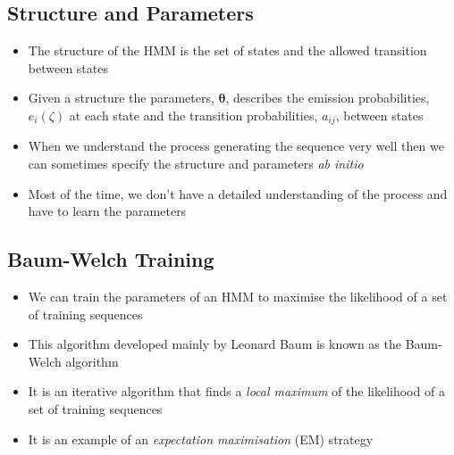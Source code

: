 
\begin{slide}
\section{Structure and Parameters}

\begin{PauseHighLight}
  \begin{itemize}
  \item The structure of the HMM is the set of states and the allowed
    transition between states\pause
  \item Given a structure the parameters, $\bm{\theta}$, describes the
    emission probabilities, $e_i(\zeta)$ at each state and the
    transition probabilities, $a_{ij}$, between states\pause
  \item When we understand the process generating the sequence very well
    then we can sometimes specify the structure and parameters
    \textit{ab initio}\pause
  \item Most of the time, we don't have a detailed understanding of the
    process and have to learn the parameters\pause
  \end{itemize}
\end{PauseHighLight}

\end{slide}


\Outline %

\begin{slide}
\section{Baum-Welch Training}

\begin{PauseHighLight}
  \begin{itemize}
  \item We can train the parameters of an HMM to maximise the likelihood
    of a set of training sequences\pause
  \item This algorithm developed mainly by Leonard Baum is known as
    the Baum-Welch algorithm\pause
  \item It is an iterative algorithm that finds a \emph{local maximum}
    of the likelihood of a set of training sequences\pause
  \item It is an example of an \emph{expectation maximisation} (EM)
    strategy\pause
  \end{itemize}
\end{PauseHighLight}

\end{slide}

